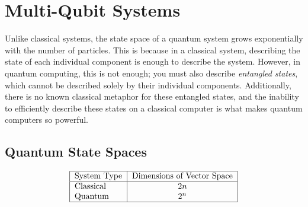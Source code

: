 \documentclass[12pt]{article}
\theoremstyle{mytheor}
\begin{document}
\section{Multi-Qubit Systems}

Unlike classical systems, the state space of a quantum system grows exponentially with the number of particles. This is because in a classical system, describing the state of each individual component is enough to describe the system. However, in quantum computing, this is not enough; you must also describe \textit{entangled states}, which cannot be described solely by their individual components. Additionally, there is no known classical metaphor for these entangled states, and the inability to efficiently describe these states on a classical computer is what makes quantum computers so powerful.

\subsection{Quantum State Spaces}

\begin{align*}
\begin{tabular}{ | l | c | }
  \hline			
  System Type & Dimensions of Vector Space \\ \hline
  Classical & $2n$ \\
  Quantum & $2^n$ \\
  \hline  
\end{tabular}
\end{align*}
\end{document}
